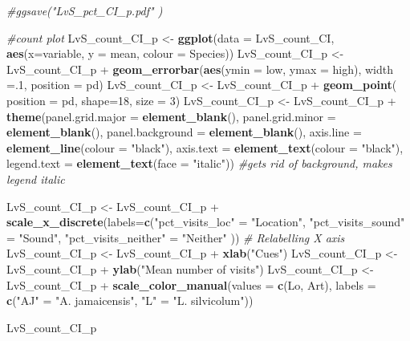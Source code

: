 \documentclass[]{article}
\newenvironment{Shaded}{\begin{snugshade}}{\end{snugshade}}
\newcommand{\KeywordTok}[1]{\textcolor[rgb]{0.13,0.29,0.53}{\textbf{{#1}}}}
\newcommand{\DataTypeTok}[1]{\textcolor[rgb]{0.13,0.29,0.53}{{#1}}}
\newcommand{\DecValTok}[1]{\textcolor[rgb]{0.00,0.00,0.81}{{#1}}}
\newcommand{\StringTok}[1]{\textcolor[rgb]{0.31,0.60,0.02}{{#1}}}
\newcommand{\CommentTok}[1]{\textcolor[rgb]{0.56,0.35,0.01}{\textit{{#1}}}}
\newcommand{\NormalTok}[1]{{#1}}
\begin{document}
\begin{Shaded}
\begin{Highlighting}[]
\CommentTok{#ggsave("LvS_pct_CI_p.pdf"  )}

\CommentTok{#count plot}
\NormalTok{LvS_count_CI_p <-}\StringTok{ }\KeywordTok{ggplot}\NormalTok{(}\DataTypeTok{data =} \NormalTok{LvS_count_CI, }\KeywordTok{aes}\NormalTok{(}\DataTypeTok{x=}\NormalTok{variable, }\DataTypeTok{y =} \NormalTok{mean, }\DataTypeTok{colour =} \NormalTok{Species))}
\NormalTok{LvS_count_CI_p <-}\StringTok{ }\NormalTok{LvS_count_CI_p +}\StringTok{ }\KeywordTok{geom_errorbar}\NormalTok{(}\KeywordTok{aes}\NormalTok{(}\DataTypeTok{ymin =} \NormalTok{low, }\DataTypeTok{ymax =} \NormalTok{high), }\DataTypeTok{width =}\NormalTok{.}\DecValTok{1}\NormalTok{, }\DataTypeTok{position =} \NormalTok{pd)}
\NormalTok{LvS_count_CI_p <-}\StringTok{ }\NormalTok{LvS_count_CI_p +}\StringTok{ }\KeywordTok{geom_point}\NormalTok{( }\DataTypeTok{position =} \NormalTok{pd, }\DataTypeTok{shape=}\DecValTok{18}\NormalTok{, }\DataTypeTok{size =} \DecValTok{3}\NormalTok{)}
\NormalTok{LvS_count_CI_p <-}\StringTok{ }\NormalTok{LvS_count_CI_p +}\StringTok{ }\KeywordTok{theme}\NormalTok{(}\DataTypeTok{panel.grid.major =} \KeywordTok{element_blank}\NormalTok{(), }\DataTypeTok{panel.grid.minor =} \KeywordTok{element_blank}\NormalTok{(),}
\DataTypeTok{panel.background =} \KeywordTok{element_blank}\NormalTok{(), }\DataTypeTok{axis.line =} \KeywordTok{element_line}\NormalTok{(}\DataTypeTok{colour =} \StringTok{"black"}\NormalTok{), }\DataTypeTok{axis.text =} \KeywordTok{element_text}\NormalTok{(}\DataTypeTok{colour =} \StringTok{"black"}\NormalTok{), }\DataTypeTok{legend.text =} \KeywordTok{element_text}\NormalTok{(}\DataTypeTok{face =} \StringTok{"italic"}\NormalTok{))  }\CommentTok{#gets rid of background, makes legend italic}

\NormalTok{LvS_count_CI_p <-}\StringTok{ }\NormalTok{LvS_count_CI_p +}\StringTok{ }\KeywordTok{scale_x_discrete}\NormalTok{(}\DataTypeTok{labels=}\KeywordTok{c}\NormalTok{(}\StringTok{"pct_visits_loc"} \NormalTok{=}\StringTok{ "Location"}\NormalTok{, }\StringTok{"pct_visits_sound"} \NormalTok{=}\StringTok{ "Sound"}\NormalTok{,}
                              \StringTok{"pct_visits_neither"} \NormalTok{=}\StringTok{ "Neither"} \NormalTok{))  }\CommentTok{# Relabelling X axis}
\NormalTok{LvS_count_CI_p <-}\StringTok{ }\NormalTok{LvS_count_CI_p +}\StringTok{ }\KeywordTok{xlab}\NormalTok{(}\StringTok{"Cues"}\NormalTok{)}
\NormalTok{LvS_count_CI_p <-}\StringTok{ }\NormalTok{LvS_count_CI_p +}\StringTok{ }\KeywordTok{ylab}\NormalTok{(}\StringTok{"Mean number of visits"}\NormalTok{)}
\NormalTok{LvS_count_CI_p <-}\StringTok{ }\NormalTok{LvS_count_CI_p +}\StringTok{ }\KeywordTok{scale_color_manual}\NormalTok{(}\DataTypeTok{values =} \KeywordTok{c}\NormalTok{(Lo, Art), }\DataTypeTok{labels =} \KeywordTok{c}\NormalTok{(}\StringTok{"AJ"} \NormalTok{=}\StringTok{ "A. jamaicensis"}\NormalTok{, }\StringTok{"L"} \NormalTok{=}\StringTok{ "L. silvicolum"}\NormalTok{))}

\NormalTok{LvS_count_CI_p }
\end{Highlighting}
\end{Shaded}
\end{document}

